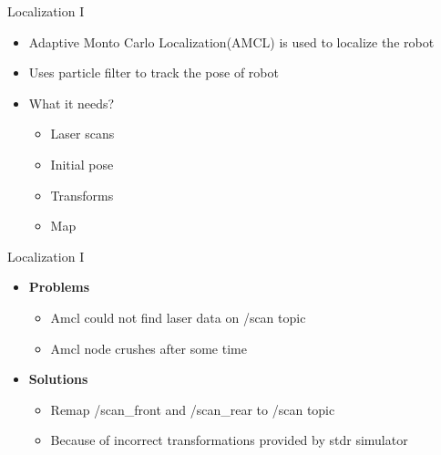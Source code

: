 \begin{frame}{Localization I}
    \begin{itemize}
        \item Adaptive Monto Carlo Localization(AMCL) is used to localize the robot
        \item Uses particle filter to track the pose of robot
        \item What it needs?
        \begin{itemize}
            \item Laser scans
            \item Initial pose
            \item Transforms
            \item Map 
        \end{itemize}
    \end{itemize}
\end{frame}

\begin{frame}{Localization I}
\begin{itemize}
	\item \textbf{Problems}
	\begin{itemize}
		\item Amcl could not find laser data on /scan topic
		\item Amcl node crushes after some time
	\end{itemize}
	\item \textbf{Solutions}
	\begin{itemize}
		\item Remap /scan\_front and /scan\_rear to /scan topic
		\item Because of incorrect transformations provided by stdr simulator
	\end{itemize}
\end{itemize}
\end{frame}